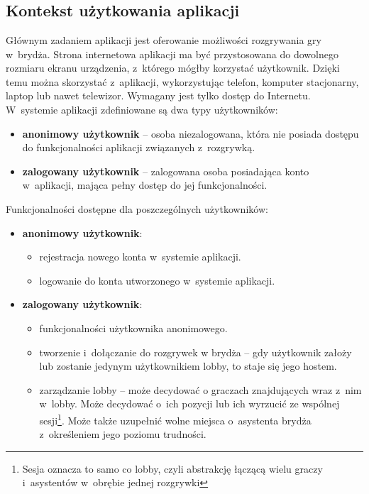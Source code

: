 \chapter{\ChapterTitleScope}
\label{sec:zakres-funkcjonalnosci}


\section{Kontekst użytkowania aplikacji}

Głównym zadaniem aplikacji jest oferowanie możliwości
rozgrywania gry w~brydża. Strona internetowa aplikacji ma być
przystosowana do dowolnego rozmiaru ekranu urządzenia, z~którego mógłby
korzystać użytkownik. Dzięki temu można skorzystać z~aplikacji, wykorzystując
telefon, komputer stacjonarny, laptop lub nawet telewizor. Wymagany
jest tylko dostęp do Internetu. \\

W~systemie aplikacji zdefiniowane są dwa typy użytkowników:
\begin{itemize}
  \item \textbf{anonimowy użytkownik} -- osoba niezalogowana, która nie
        posiada dostępu do funkcjonalności aplikacji związanych
        z~rozgrywką.

  \item \textbf{zalogowany użytkownik} -- zalogowana osoba posiadająca konto
        w~aplikacji, mająca pełny dostęp do jej funkcjonalności.
\end{itemize}

Funkcjonalności dostępne dla poszczególnych użytkowników:
\begin{itemize}
  \item \textbf{anonimowy użytkownik}:
        \begin{itemize}
          \item rejestracja nowego konta w~systemie aplikacji.
          \item logowanie do konta utworzonego w~systemie aplikacji.
        \end{itemize}

  \item \textbf{zalogowany użytkownik}:
        \begin{itemize}
          \item funkcjonalności użytkownika anonimowego.
          \item tworzenie i~dołączanie do rozgrywek w brydża --
                gdy użytkownik założy lub zostanie jedynym
                użytkownikiem lobby, to staje się jego
                hostem.
          \item zarządzanie lobby -- może decydować o graczach znajdujących wraz
                z~nim w~lobby. Może decydować o~ich pozycji lub ich wyrzucić
                ze wspólnej sesji\footnote{Sesja oznacza to samo co lobby, czyli
                  abstrakcję łączącą wielu graczy i~asystentów w~obrębie jednej
                  rozgrywki}.
                Może także uzupełnić wolne miejsca o~asystenta brydża z~określeniem jego
                poziomu trudności.
        \end{itemize}
\end{itemize}

